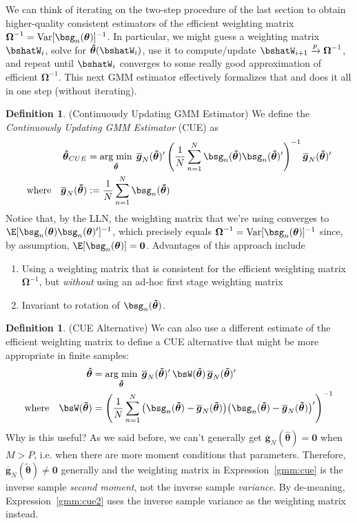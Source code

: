 \documentclass[12pt]{article}
\theoremstyle{plain}
\theoremstyle{definition}
\newtheorem{defn}[thm]{Definition}
\theoremstyle{remark}
\newcommand{\bstheta}{\boldsymbol{\theta}}
\newcommand{\bsOmega}{\boldsymbol{\Omega}}
\newcommand{\bshattheta}{\boldsymbol{\hat{\theta}}}
\newcommand{\bstildetheta}{\boldsymbol{\tilde{\theta}}}
\newcommand{\bsbarg}{\boldsymbol{\overline{g}}}
\renewcommand{\bso}{\boldsymbol{0}}
\DeclareMathOperator*{\argmin}{arg\;min}
\newcommand{\Var}{\operatorname{Var}}
\newcommand{\pto}{\xrightarrow{p}}
\newcommand{\sumnN}{\sum^N_{n=1}}
\begin{document}
We can think of iterating on the two-step procedure of the last section
to obtain higher-quality consistent estimators of the efficient
weighting matrix $\bsOmega^{-1}=\Var[\bsg_n(\bstheta)]^{-1}$. In
particular, we might guess a weighting matrix $\bshatW_i$, solve for
$\bshattheta(\bshatW_i)$, use it to compute/update
$\bshatW_{i+1}\pto\bsOmega^{-1}$, and repeat until $\bshatW_i$ converges
to some really good approximation of efficient $\bsOmega^{-1}$. This
next GMM estimator effectively formalizes that and does it all in one
step (without iterating).

\begin{defn}(Continuously Updating GMM Estimator)
We define the \emph{Continuously Updating GMM Estimator} (CUE)
as
\begin{align}
  \bshattheta_{CUE}
  &=
  \argmin_{\bstildetheta}\;
  \bsbarg_N(\bstildetheta)'
  \left(
  \frac{1}{N}
  \sumnN
  \bsg_n(\bstildetheta)
  \bsg_n(\bstildetheta)'
  \right)^{-1}
  \bsbarg_N(\bstildetheta)'
  \label{gmm:cue}
  \\
  \text{where}\quad
  \bsbarg_N(\bstildetheta)
  &:= \frac{1}{N}\sumnN \bsg_n(\bstildetheta)
  \notag
\end{align}
Notice that, by the LLN, the weighting matrix that we're using converges
to $\E[\bsg_n(\bstheta)\bsg_n(\bstheta)']^{-1}$, which precisely equals
$\bsOmega^{-1}=\Var[\bsg_n(\bstheta)]^{-1}$ since,
by assumption, $\E[\bsg_n(\bstheta)]=\bso$.
Advantages of this approach include
\begin{enumerate}[label=(\roman*)]
  \item Using a weighting matrix that is consistent for the efficient
    weighting matrix $\bsOmega^{-1}$, but \emph{without} using an ad-hoc
    first stage weighting matrix
  \item Invariant to rotation of $\bsg_n(\bstildetheta)$.
\end{enumerate}
\end{defn}

\begin{defn}(CUE Alternative)
We can also use a different estimate of the efficient weighting matrix
to define a CUE alternative that might be more appropriate in finite
samples:
\begin{align}
  \bshattheta
  &=
  \argmin_{\bstildetheta}\;
  \bsbarg_N(\bstildetheta)'
  \,
  \bsW(\bstildetheta)
  \,
  \bsbarg_N(\bstildetheta)'
  \label{gmm:cue2}
  \\
  \text{where}\quad
  \bsW(\bstildetheta)
  &=
  \left(
  \frac{1}{N}
  \sumnN
  \big(
  \bsg_n(\bstildetheta)
  -
  \bsbarg_N(\bstildetheta)
  \big)
  \big(
  \bsg_n(\bstildetheta)
  -
  \bsbarg_N(\bstildetheta)
  \big)'
  \right)^{-1}
  \notag
\end{align}
Why is this useful?
As we said before, we can't generally get $\bsbarg_N(\bshattheta)=\bso$
when $M>P$, i.e. when there are more moment conditions that parameters.
Therefore, $\bsbarg_N(\bstildetheta)\neq\bso$ generally and the weighting
matrix in Expression~\ref{gmm:cue} is the inverse sample \emph{second
moment}, not the inverse sample \emph{variance}.
By de-meaning, Expression~\ref{gmm:cue2} uses the inverse sample
variance as the weighting matrix instead.
\end{defn}
\end{document}
